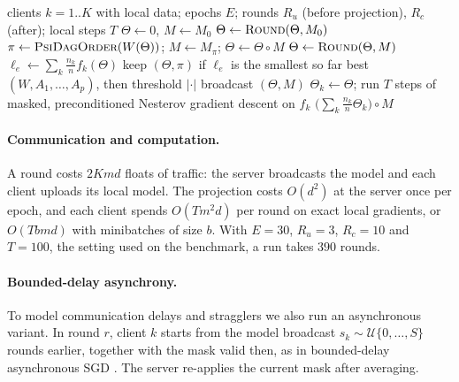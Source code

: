 \begin{algorithm}[t]
\caption{\feddbn{} (server view). $K=1$ gives centralised \psidbn.}
\label{alg:feddbn}
\begin{algorithmic}[1]
\Require clients $k=1..K$ with local data; epochs $E$; rounds $R_u$ (before projection), $R_c$ (after); local steps $T$
\State $\Theta\gets 0$, \quad $M\gets M_0$ 
   \quad $\Theta\gets \textsc{Round}(\Theta, M_0)$ \EndFor
  \State $\pi\gets\textsc{PsiDagOrder}(W(\Theta))$; \quad $M\gets M_\pi$; \quad $\Theta\gets\Theta\circ M$
   \quad $\Theta\gets \textsc{Round}(\Theta, M)$ \EndFor
  \State $\ell_e\gets\sum_k \frac{n_k}{n} f_k(\Theta)$ 
  \State keep $(\Theta,\pi)$ if $\ell_e$ is the smallest so far
\EndFor
\State \Return best $(W, A_1,\dots,A_p)$, then threshold $|\cdot|$
\Statex
{} 
  \State broadcast $(\Theta, M)$ 
     \State $\Theta_k\gets\Theta$; run $T$ steps of masked, preconditioned Nesterov gradient descent on $f_k$
  \EndFor
  \State \Return $\big(\sum_k \frac{n_k}{n}\Theta_k\big)\circ M$ 
\EndFunction
\end{algorithmic}
\end{algorithm}

\paragraph{Communication and computation.}
A round costs $2Kmd$ floats of traffic: the server broadcasts the model and each client
uploads its local model. The projection costs $O(d^2)$ at the server once per epoch, and each
client spends $O(T m^2 d)$ per round on exact local gradients, or $O(T b m d)$ with minibatches
of size $b$. With $E=30$, $R_u=3$, $R_c=10$ and $T=100$, the setting used on the \exdbn{}
benchmark, a run takes $390$ rounds.

\paragraph{Bounded-delay asynchrony.}
To model communication delays and stragglers we also run an asynchronous variant. In round
$r$, client $k$ starts from the model broadcast $s_k\sim\mathcal{U}\{0,\dots,S\}$ rounds
earlier, together with the mask valid then, as in bounded-delay asynchronous SGD
\citep{lian2015async}. The server re-applies the current mask after averaging.

